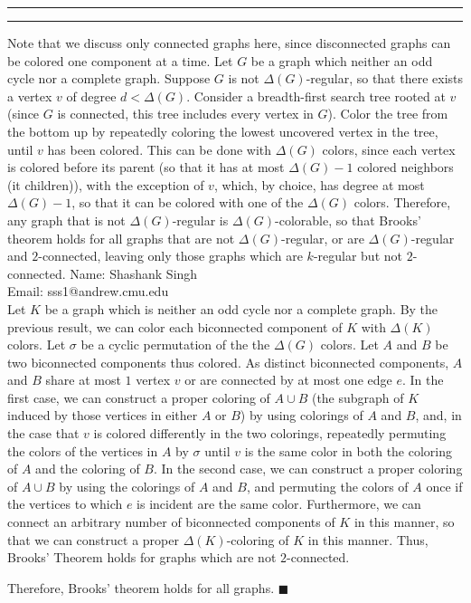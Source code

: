 \documentclass[11pt]{article}
\makeatletter
\newcounter{questionCounter}
\newcounter{partCounter}[questionCounter]
\newenvironment{question}[2][\arabic{questionCounter}]{%
    \setcounter{partCounter}{0}%
    \vspace{.25in} \hrule \vspace{0.5em}%
        \noindent{\bf #2}%
    \vspace{0.8em} \hrule \vspace{.10in}%
    \addtocounter{questionCounter}{1}%
}{}
\newcommand{\myname}{Shashank Singh}
\newcommand{\myandrew}{sss1@andrew.cmu.edu}
\renewcommand{\qed}{\quad $\blacksquare$}
\makeatother
\begin{document}
\begin{question}{Problem 4}
Note that we discuss only connected graphs here, since disconnected graphs can
be colored one component at a time.
Let $G$ be a graph which neither an odd cycle nor a complete graph. Suppose
$G$ is not $\Delta(G)$-regular, so that there exists a vertex $v$ of degree
$d < \Delta(G)$. Consider a breadth-first search tree rooted at $v$ (since $G$
is connected, this tree includes every vertex in $G$). Color the tree from the
bottom up by repeatedly coloring the lowest uncovered vertex in the tree,
until $v$ has been colored. This can be done with $\Delta(G)$ colors, since
each vertex is colored before its parent (so that it has at most
$\Delta(G) - 1$ colored neighbors (it children)), with the exception of $v$,
which, by choice, has degree at most $\Delta(G) - 1$, so that it can be
colored with one of the $\Delta(G)$ colors. Therefore, any graph that is not
$\Delta(G)$-regular is $\Delta(G)$-colorable, so that Brooks' theorem holds
for all graphs that are not $\Delta(G)$-regular, or are $\Delta(G)$-regular
and $2$-connected, leaving only those graphs which are $k$-regular but not
$2$-connected.
\newpage
Name: \myname \\
Email: \myandrew \\

Let $K$ be a graph which is neither an odd cycle nor a complete graph. By the
previous result, we can color each biconnected component of $K$ with
$\Delta(K)$ colors. Let $\sigma$ be a cyclic permutation of the the
$\Delta(G)$ colors. Let $A$ and $B$ be two biconnected components thus
colored. As distinct biconnected components, $A$ and $B$ share at most $1$
vertex $v$ or are connected by at most one edge $e$. In the first case, we can
construct a proper coloring of $A \cup B$ (the subgraph of $K$ induced by
those vertices in either $A$ or $B$) by using colorings of $A$ and $B$, and,
in the case that $v$ is colored differently in the two colorings, repeatedly
permuting the colors of the vertices in $A$ by $\sigma$ until $v$ is the same
color in both the coloring of $A$ and the coloring of $B$. In the second case,
we can construct a proper coloring of $A \cup B$ by using the colorings of $A$
and $B$, and permuting the colors of $A$ once if the vertices to which $e$ is
incident are the same color. Furthermore, we can connect an arbitrary number
of biconnected components of $K$ in this manner, so that we can construct a
proper $\Delta(K)$-coloring of $K$ in this manner. Thus, Brooks' Theorem holds
for graphs which are not $2$-connected.

Therefore, Brooks' theorem holds for all graphs. \qed
\end{question}
\end{document}
